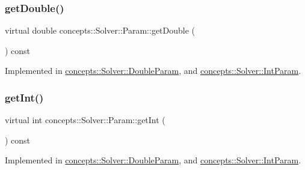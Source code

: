 \mbox{\label{classconcepts_1_1_solver_1_1_param_a50d288b81da0b77d342e46e75f9b4bfc}} 
\subsubsection{\texorpdfstring{get\+Double()}{getDouble()}}
{\footnotesize\ttfamily virtual double concepts\+::\+Solver\+::\+Param\+::get\+Double (\begin{DoxyParamCaption}{ }\end{DoxyParamCaption}) const\hspace{0.3cm}{\ttfamily [pure virtual]}}



Implemented in \hyperlink{classconcepts_1_1_solver_1_1_double_param_a39d5bb1d5b33ef84c8c015b977b438d9}{concepts\+::\+Solver\+::\+Double\+Param}, and \hyperlink{classconcepts_1_1_solver_1_1_int_param_a70b472a5cce3b44e0d9a08f5da70e1a4}{concepts\+::\+Solver\+::\+Int\+Param}.

\mbox{\label{classconcepts_1_1_solver_1_1_param_ab849633a029055c00d828df3adb0546e}} 
\subsubsection{\texorpdfstring{get\+Int()}{getInt()}}
{\footnotesize\ttfamily virtual int concepts\+::\+Solver\+::\+Param\+::get\+Int (\begin{DoxyParamCaption}{ }\end{DoxyParamCaption}) const\hspace{0.3cm}{\ttfamily [pure virtual]}}



Implemented in \hyperlink{classconcepts_1_1_solver_1_1_double_param_a19c83a217a6b73891548850869e9c230}{concepts\+::\+Solver\+::\+Double\+Param}, and \hyperlink{classconcepts_1_1_solver_1_1_int_param_a8ff3d45bcc5fc60750183e61ff61b48e}{concepts\+::\+Solver\+::\+Int\+Param}.

\mbox{\label{classconcepts_1_1_solver_1_1_param_a0c2e4d895747668b01339db9226eceae}} 
